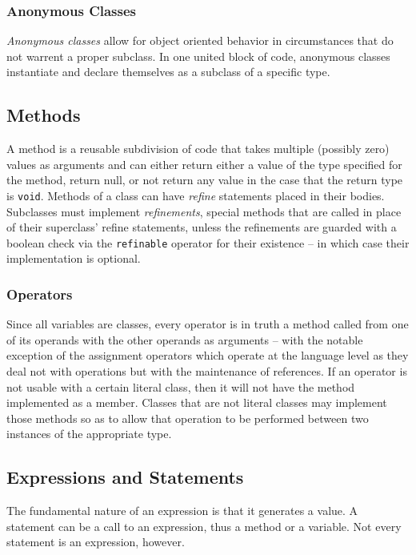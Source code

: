 \subsubsection{Anonymous Classes}
\textit{Anonymous classes} allow for object oriented behavior in circumstances that do not warrent a proper subclass. In one united block of code, anonymous classes instantiate and declare themselves as a subclass of a specific type.

\subsection{Methods}
A method is a reusable subdivision of code that takes multiple (possibly zero) values as arguments and can either return either a value of the type specified for the method, return null, or not return any value in the case that the return type is \verb!void!. Methods of a class can have \textit{refine} statements placed in their bodies. Subclasses must implement \textit{refinements}, special methods that are called in place of their superclass' refine statements, unless the refinements are guarded with a boolean check via the \verb!refinable! operator for their existence -- in which case their implementation is optional.

\subsubsection{Operators}
Since all variables are classes, every operator is in truth a method called from one of its operands with the other operands as arguments -- with the notable exception of the assignment operators which operate at the language level as they deal not with operations but with the maintenance of references. If an operator is not usable with a certain literal class, then it will not have the method implemented as a member. Classes that are not literal classes may implement those methods so as to allow that operation to be performed between two instances of the appropriate type.

\subsection{Expressions and Statements}
The fundamental nature of an expression is that it generates a value. A statement can be a call to an expression, thus a method or a variable. Not every statement is an expression, however.
